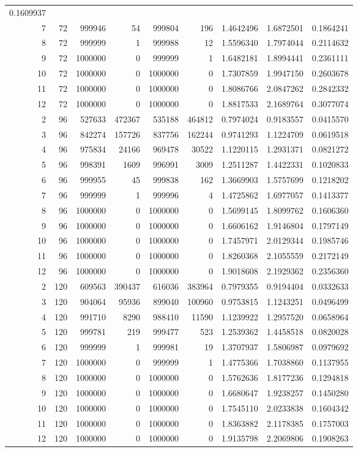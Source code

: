 \documentclass[]{article}
\begin{document}
\begin{longtable}[]{@{}rrrrrrrrr@{}}
0.1609937\tabularnewline
7 & 72 & 999946 & 54 & 999804 & 196 & 1.4642496 & 1.6872501 &
0.1864241\tabularnewline
8 & 72 & 999999 & 1 & 999988 & 12 & 1.5596340 & 1.7974044 &
0.2114632\tabularnewline
9 & 72 & 1000000 & 0 & 999999 & 1 & 1.6482181 & 1.8994441 &
0.2361111\tabularnewline
10 & 72 & 1000000 & 0 & 1000000 & 0 & 1.7307859 & 1.9947150 &
0.2603678\tabularnewline
11 & 72 & 1000000 & 0 & 1000000 & 0 & 1.8086766 & 2.0847262 &
0.2842332\tabularnewline
12 & 72 & 1000000 & 0 & 1000000 & 0 & 1.8817533 & 2.1689764 &
0.3077074\tabularnewline
2 & 96 & 527633 & 472367 & 535188 & 464812 & 0.7974024 & 0.9183557 &
0.0415570\tabularnewline
3 & 96 & 842274 & 157726 & 837756 & 162244 & 0.9741293 & 1.1224709 &
0.0619518\tabularnewline
4 & 96 & 975834 & 24166 & 969478 & 30522 & 1.1220115 & 1.2931371 &
0.0821272\tabularnewline
5 & 96 & 998391 & 1609 & 996991 & 3009 & 1.2511287 & 1.4422331 &
0.1020833\tabularnewline
6 & 96 & 999955 & 45 & 999838 & 162 & 1.3669903 & 1.5757699 &
0.1218202\tabularnewline
7 & 96 & 999999 & 1 & 999996 & 4 & 1.4725862 & 1.6977057 &
0.1413377\tabularnewline
8 & 96 & 1000000 & 0 & 1000000 & 0 & 1.5699145 & 1.8099762 &
0.1606360\tabularnewline
9 & 96 & 1000000 & 0 & 1000000 & 0 & 1.6606162 & 1.9146804 &
0.1797149\tabularnewline
10 & 96 & 1000000 & 0 & 1000000 & 0 & 1.7457971 & 2.0129344 &
0.1985746\tabularnewline
11 & 96 & 1000000 & 0 & 1000000 & 0 & 1.8260368 & 2.1055559 &
0.2172149\tabularnewline
12 & 96 & 1000000 & 0 & 1000000 & 0 & 1.9018608 & 2.1929362 &
0.2356360\tabularnewline
2 & 120 & 609563 & 390437 & 616036 & 383964 & 0.7979355 & 0.9194404 &
0.0332633\tabularnewline
3 & 120 & 904064 & 95936 & 899040 & 100960 & 0.9753815 & 1.1243251 &
0.0496499\tabularnewline
4 & 120 & 991710 & 8290 & 988410 & 11590 & 1.1239922 & 1.2957520 &
0.0658964\tabularnewline
5 & 120 & 999781 & 219 & 999477 & 523 & 1.2539362 & 1.4458518 &
0.0820028\tabularnewline
6 & 120 & 999999 & 1 & 999981 & 19 & 1.3707937 & 1.5806987 &
0.0979692\tabularnewline
7 & 120 & 1000000 & 0 & 999999 & 1 & 1.4775366 & 1.7038860 &
0.1137955\tabularnewline
8 & 120 & 1000000 & 0 & 1000000 & 0 & 1.5762636 & 1.8177236 &
0.1294818\tabularnewline
9 & 120 & 1000000 & 0 & 1000000 & 0 & 1.6680647 & 1.9238257 &
0.1450280\tabularnewline
10 & 120 & 1000000 & 0 & 1000000 & 0 & 1.7545110 & 2.0233838 &
0.1604342\tabularnewline
11 & 120 & 1000000 & 0 & 1000000 & 0 & 1.8363882 & 2.1178385 &
0.1757003\tabularnewline
12 & 120 & 1000000 & 0 & 1000000 & 0 & 1.9135798 & 2.2069806 &
0.1908263\tabularnewline
\bottomrule
\end{longtable}
\end{document}
